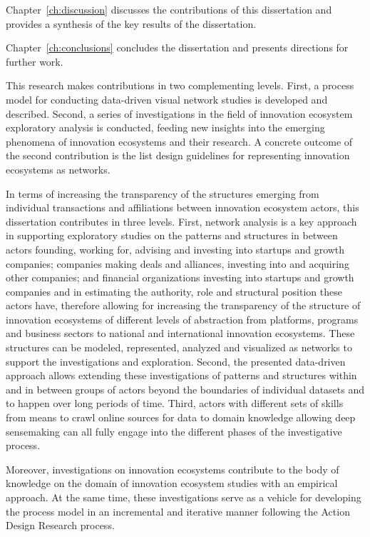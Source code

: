 Chapter~\ref{ch:discussion} discusses the contributions of this dissertation and provides a synthesis of the key results of the dissertation.

Chapter~\ref{ch:conclusions} concludes the dissertation and presents directions for further work.
 
This research makes contributions in two complementing levels. First, a process model for conducting data-driven visual network studies is developed and described. Second, a series of investigations in the field of innovation ecosystem exploratory analysis is conducted, feeding new insights into the emerging phenomena of innovation ecosystems and their research. A concrete outcome of the second contribution is the list design guidelines for representing innovation ecosystems as networks.

In terms of increasing the transparency of the structures emerging from individual transactions and affiliations between innovation ecosystem actors, this dissertation contributes in three levels. First, network analysis is a key approach in supporting exploratory studies on the patterns and structures in between actors founding, working for, advising and investing into startups and growth companies; companies making deals and alliances, investing into and acquiring other companies; and financial organizations investing into startups and growth companies  and in estimating the authority, role and structural position these actors have, therefore allowing for increasing the transparency of the structure of innovation ecosystems of different levels of abstraction from platforms, programs and business sectors to national and international innovation ecosystems. These structures can be modeled, represented, analyzed and visualized as networks to support the investigations and exploration. Second, the presented data-driven approach allows extending these investigations of patterns and structures within and in between groups of actors beyond the boundaries of individual datasets and to happen over long periods of time. Third, actors with different sets of skills from means to crawl online sources for data to domain knowledge allowing deep sensemaking can all fully engage into the different phases of the investigative process.

Moreover, investigations on innovation ecosystems contribute to the body of knowledge on the domain of innovation ecosystem studies with an empirical approach. At the same time, these investigations serve as a vehicle for developing the process model in an incremental and iterative manner following the Action Design Research process.
 
